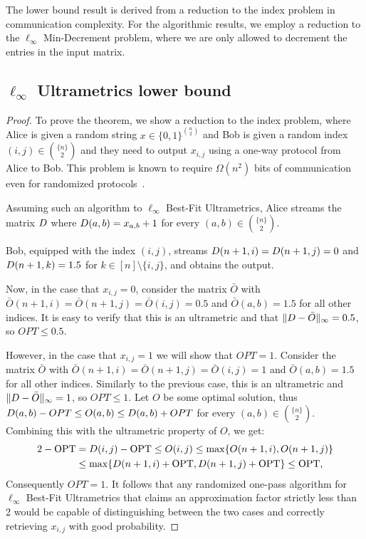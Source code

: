 \documentclass{article}
\begin{document}
The lower bound result is derived from a reduction to the index problem in communication complexity. For the algorithmic results, we employ a reduction to the $\ell_\infty$ Min-Decrement problem, where we are only allowed to decrement the entries in the input matrix.

\subsection{\texorpdfstring{$\ell_\infty$ Ultrametrics lower bound}{l-inf Ultrametrics lower bound}}

\newcommand{\infnorm}[1]{\lVert #1 \rVert_{\infty}}

\linftylowerbound*

\begin{proof}
    To prove the theorem, we show a reduction to the index problem, where Alice is given a random string $x\in \{0,1\} ^{{ \binom{n}{2}}}$ and Bob is given a random index $(i,j) \in {\binom{\{n \}}{2}}$ and they need to output $x_{i,j}$ using a one-way protocol from Alice to Bob. This problem is known to require $\Omega(n^2)$ bits of communication even for randomized protocols~\cite{ablayev1996lower}.

    Assuming such an algorithm to $\ell_\infty$ Best-Fit Ultrametrics, Alice streams the matrix $D$ where $D (a,b)=x_{a,b}+1$ for every $(a,b) \in {\binom{\{ n \}}{2}}$.

    Bob, equipped with the index $(i,j)$, streams $D(n+1,i)= D (n+1,j)=0$ and $D (n+1,k)=1.5$ for $k \in [n] \setminus \{ i,j \}$, and obtains the output.

    Now, in the case that $x_{i,j}=0$, consider the matrix $\bar{O}$ with $\bar{O} (n+1,i)=\bar{O} ({n+1,j})=\bar{O} ({i,j})=0.5$ and $\bar{O} ({a,b})=1.5$ for all other indices.
    It is easy to verify that this is an ultrametric and that $\infnorm{\inputmatrix-\bar{O}} = 0.5$, so $OPT \leq 0.5$.

    However, in the case that $x_{i,j}=1$ we will show that $OPT=1$.
    Consider the matrix $\bar{O}$ with $\bar{O} (n+1,i)=\bar{O} ({n+1,j})=\bar{O} ({i,j})=1$ and $\bar{O} ({a,b})=1.5$ for all other indices.
    Similarly to the previous case, this is an ultrametric and $\infnorm{\inputmatrix-\bar{O}} = 1$, so $OPT \leq 1$. Let $O$ be some optimal solution, thus $D ({a,b})-OPT \leq O ({a,b}) \leq D ({a,b})+OPT$ for every $(a,b) \in {\binom{\{n \}}{2}}$. Combining this with the ultrametric property of $O$, we get:
    \begin{align*}
    2 - \text{OPT} &= D (i,j) - \text{OPT} \leq O (i,j) \leq \max \{ O ({n+1,i}), O ({n+1,j}) \} \\
    &\leq \max \{ D ({n+1,i}) + \text{OPT}, D ({n+1,j}) + \text{OPT} \} \leq \text{OPT},
    \end{align*}
    Consequently $OPT=1$. It follows that any randomized one-pass algorithm for $\ell_\infty$ Best-Fit Ultrametrics that claims an approximation factor strictly less than 2 would be capable of distinguishing between the two cases and correctly retrieving $x_{i,j}$ with good probability.
\end{proof}
\end{document}

